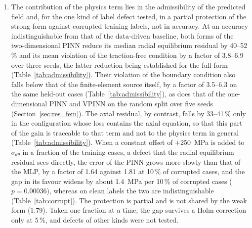 \begin{enumerate}
\item The contribution of the physics term lies in the admissibility of the predicted field and, for the one kind of label defect tested, in a partial protection of the strong form against corrupted training labels, not in accuracy. At an accuracy indistinguishable from that of the data-driven baseline, both forms of the two-dimensional PINN reduce its median radial equilibrium residual by 40--52\,\% and its mean violation of the traction-free condition by a factor of 3.8--6.9 over three seeds, the latter reduction being established for the full form (Table~\ref{tab:admissibility}). Their violation of the boundary condition also falls below that of the finite-element source itself, by a factor of 3.5--6.3 on the same held-out cases (Table~\ref{tab:admissibility}), as does that of the one-dimensional PINN and VPINN on the random split over five seeds (Section~\ref{sec:res_fem}). The axial residual, by contrast, falls by 33--41\,\% only in the configuration whose loss contains the axial equation, so that this part of the gain is traceable to that term and not to the physics term in general (Table~\ref{tab:admissibility}). When a constant offset of $+250$~MPa is added to $\sigma_{\theta\theta}$ in a fraction of the training cases, a defect that the radial equilibrium residual sees directly, the error of the PINN grows more slowly than that of the MLP, by a factor of 1.64 against 1.81 at 10\,\% of corrupted cases, and the gap in its favour widens by about 1.4~MPa per 10\,\% of corrupted cases ($p=0.00036$), whereas on clean labels the two are indistinguishable (Table~\ref{tab:corrupt}). The protection is partial and is not shared by the weak form (1.79). Taken one fraction at a time, the gap survives a Holm correction only at 5\,\%, and defects of other kinds were not tested. %


\end{enumerate}
